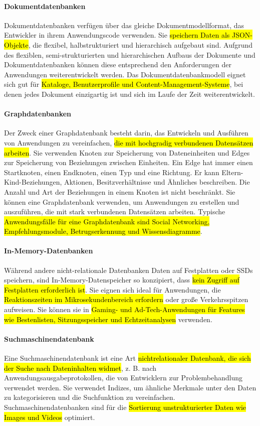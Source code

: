 \paragraph{Dokumentdatenbanken} Dokumentdatenbanken verfügen über das gleiche Dokumentmodellformat, das Entwickler in ihrem Anwendungscode verwenden. Sie \hl{speichern Daten als JSON-Objekte}, die flexibel, halbstrukturiert und hierarchisch aufgebaut sind. Aufgrund des flexiblen, semi-strukturierten und hierarchischen Aufbaus der Dokumente und Dokumentdatenbanken können diese entsprechend den Anforderungen der Anwendungen weiterentwickelt werden. Das Dokumentdatenbankmodell eignet sich gut für \hl{Kataloge, Benutzerprofile und Content-Management-Systeme}, bei denen jedes Dokument einzigartig ist und sich im Laufe der Zeit weiterentwickelt.

\paragraph{Graphdatenbanken} Der Zweck einer Graphdatenbank besteht darin, das Entwickeln und Ausführen von Anwendungen zu vereinfachen, \hl{die mit hochgradig verbundenen Datensätzen arbeiten}. Sie verwenden Knoten zur Speicherung von Dateneinheiten und Edges zur Speicherung von Beziehungen zwischen Einheiten. Ein Edge hat immer einen Startknoten, einen Endknoten, einen Typ und eine Richtung. Er kann Eltern-Kind-Beziehungen, Aktionen, Besitzverhältnisse und Ähnliches beschreiben. Die Anzahl und Art der Beziehungen in einem Knoten ist nicht beschränkt. Sie können eine Graphdatenbank verwenden, um Anwendungen zu erstellen und auszuführen, die mit stark verbundenen Datensätzen arbeiten. Typische \hl{Anwendungsfälle für eine Graphdatenbank sind Social Networking, Empfehlungsmodule, Betrugserkennung und Wissensdiagramme}.

\paragraph{In-Memory-Datenbanken} Während andere nicht-relationale Datenbanken Daten auf Festplatten oder SSDs speichern, sind In-Memory-Datenspeicher so konzipiert, dass \hl{kein Zugriff auf Festplatten erforderlich ist}. Sie eignen sich ideal für Anwendungen, die \hl{Reaktionszeiten im Mikrosekundenbereich erfordern} oder große Verkehrsspitzen aufweisen. Sie können sie in \hl{Gaming- und Ad-Tech-Anwendungen für Features wie Bestenlisten, Sitzungsspeicher und Echtzeitanalysen} verwenden. 

\paragraph{Suchmaschinendatenbank} Eine Suchmaschinendatenbank ist eine Art \hl{nichtrelationaler Datenbank, die sich der Suche nach Dateninhalten widmet}, z. B. nach Anwendungsausgabeprotokollen, die von Entwicklern zur Problembehandlung verwendet werden. Sie verwendet Indizes, um ähnliche Merkmale unter den Daten zu kategorisieren und die Suchfunktion zu vereinfachen. Suchmaschinendatenbanken sind für die \hl{Sortierung unstrukturierter Daten wie Images und Videos} optimiert. 

